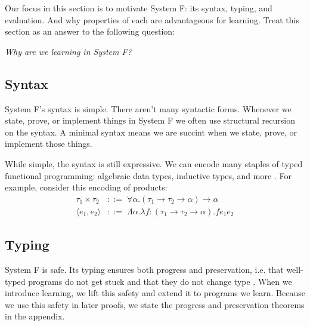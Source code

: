 \documentclass[acmsmall]{acmart}
\theoremstyle{mytheoremstyle}
\begin{document}
Our focus in this section is to motivate System F: its syntax, typing, and evaluation. And why properties of each are advantageous for learning. Treat this section as an answer to the following question: 
\begin{displayquote}
\textit{Why are we learning in System F?}
\centering
\end{displayquote}
\subsection{Syntax}

System F's syntax is simple. There aren't many syntactic forms. Whenever we state, prove, or implement things in System F we often use structural recursion on the syntax. A minimal syntax means we are succint when we state, prove, or implement those things.

While simple, the syntax is still expressive. We can encode many staples of typed functional programming: algebraic data types, inductive types, and more \cite{pierce2002types}. For example, consider this encoding of products:
\begin{align*}
\tau_1 \times \tau_2 \,&::=\; \forall \alpha.(\tau_1 \to \tau_2 \to \alpha) \to \alpha\\
\langle e_1,e_2 \rangle &::=\; \Lambda \alpha.\lambda f\!:\!(\tau_1 \to \tau_2 \to \alpha).fe_1e_2 
\end{align*}

\subsection{Typing}
System F is safe. Its typing ensures both progress and preservation, i.e. that well-typed programs do not get stuck and that they do not change type \cite{pierce2002types}. When we introduce learning, we lift this safety and extend it to programs we learn. Because we use this safety in later proofs, we state the progress and preservation theorems in the appendix.
\end{document}
